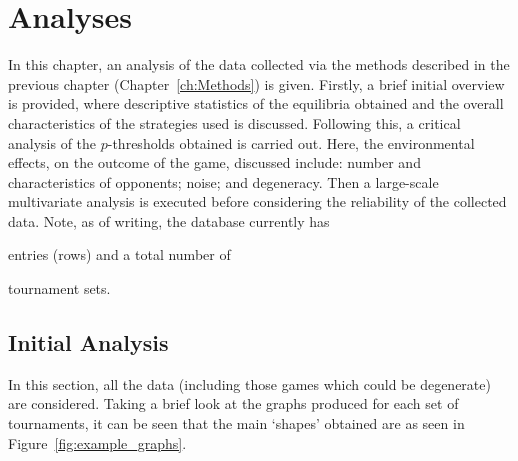 \chapter{Analyses}\label{ch:Analyses}
In this chapter, an analysis of the data collected via the methods described in
the previous chapter (Chapter~\ref{ch:Methods}) is given. Firstly, a brief
initial overview is provided, where descriptive statistics of the equilibria
obtained and the overall characteristics of the strategies used is discussed.
Following this, a critical analysis of the \(p\)-thresholds obtained is carried
out. Here, the environmental effects, on the outcome of the game, discussed
include: number and characteristics of opponents; noise; and degeneracy. Then a
large-scale multivariate analysis is executed before considering the reliability
of the collected data. Note, as of writing, the database currently has 

entries (rows) and a total number of 

tournament sets. 

\section{Initial Analysis}\label{sec:Initial_Analysis}
In this section, all the data (including those games which could be degenerate)
are considered. Taking a brief look at the graphs produced for each set of
tournaments, it can be seen that the main `shapes' obtained are as seen in
Figure~\ref{fig:example_graphs}.

